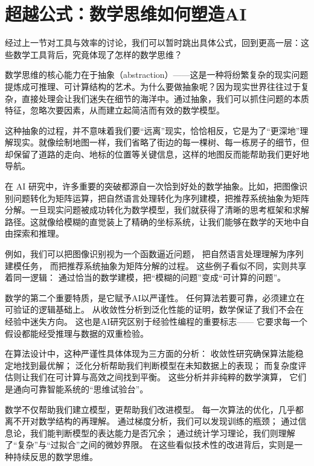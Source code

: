\section{超越公式：数学思维如何塑造AI}

经过上一节对工具与效率的讨论，我们可以暂时跳出具体公式，回到更高一层：这些数学工具背后，究竟体现了怎样的数学思维？


数学思维的核心能力在于抽象（abstraction）——这是一种将纷繁复杂的现实问题提炼成可推理、可计算结构的艺术。为什么要做抽象呢？因为现实世界往往过于复杂，直接处理会让我们迷失在细节的海洋中。通过抽象，我们可以抓住问题的本质特征，忽略次要因素，从而建立起简洁而有效的数学模型。

这种抽象的过程，并不意味着我们要“远离”现实，恰恰相反，它是为了“更深地”理解现实。就像绘制地图一样，我们省略了街边的每一棵树、每一栋房子的细节，但却保留了道路的走向、地标的位置等关键信息，这样的地图反而能帮助我们更好地导航。

在 AI 研究中，许多重要的突破都源自一次恰到好处的数学抽象。比如，把图像识别问题转化为矩阵运算，把自然语言处理转化为序列建模，把推荐系统抽象为矩阵分解。一旦现实问题被成功转化为数学模型，我们就获得了清晰的思考框架和求解路径。这就像给模糊的直觉装上了精确的坐标系统，让我们能够在数学的天地中自由探索和推理。

例如，我们可以把图像识别视为一个函数逼近问题，  
把自然语言处理理解为序列建模任务，  
而把推荐系统抽象为矩阵分解的过程。  
这些例子看似不同，实则共享着同一逻辑：  
通过恰当的数学建模，把“模糊的问题”变成“可计算的问题”。

数学的第二个重要特质，是它赋予AI以严谨性。  
任何算法若要可靠，必须建立在可验证的逻辑基础上。  
从收敛性分析到泛化性能的证明，数学保证了我们不会在经验中迷失方向。  
这也是AI研究区别于经验性编程的重要标志——  
它要求每一个假设都能经受推理与数据的双重检验。

在算法设计中，这种严谨性具体体现为三方面的分析：  
收敛性研究确保算法能稳定地找到最优解；  
泛化分析帮助我们判断模型在未知数据上的表现；  
而复杂度评估则让我们在可计算与高效之间找到平衡。  
这些分析并非纯粹的数学演算，  
它们是通向可靠智能系统的“思维试验台”。

数学不仅帮助我们建立模型，更帮助我们改进模型。  
每一次算法的优化，几乎都离不开对数学结构的再理解。  
通过梯度分析，我们可以发现训练的瓶颈；  
通过信息论，我们能判断模型的表达能力是否冗余；  
通过统计学习理论，我们则理解了“复杂”与“过拟合”之间的微妙界限。  
在这些看似技术性的改进背后，实则是一种持续反思的数学思维。

